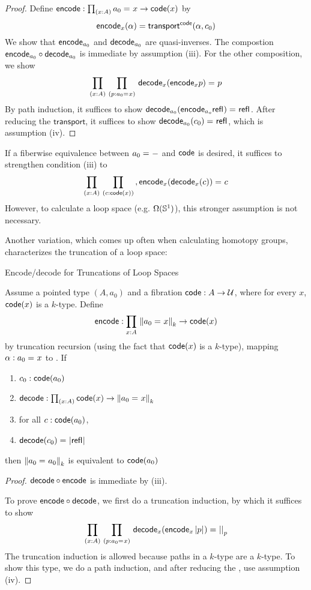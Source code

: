 \begin{proof}
Define
$\encode : \prd{x:A} \id{a_0}{x} \to \code(x)$ by
\[
\encode_x(\alpha) = \transfib{\code}{\alpha}{c_0}
\]
We show that $\encode_{a_0}$ and $\decode_{a_0}$ are quasi-inverses.  
The compostion $\encode_{a_0} \circ \decode_{a_0}$ is immediate by
assumption (iii).  For the other composition, we show
\[
\prd{x:A}{p : \id{a_0}{x}} \id{\decode_{x} (\encode_{x} p)}{p}
\] 
By path induction, it suffices to show 
$\id{{\decode_{{a_0}} (\encode_{{a_o}} \refl{})}}{\refl{}}$.
After reducing the $\mathsf{transport}$, it suffices to show 
$\id{{\decode_{{a_0}} (c_0)}}{\refl{}}$, which is assumption (iv).  
\end{proof}

If a fiberwise equivalence between $\id{a_0}{-}$ and $\code$ is desired,
it suffices to strengthen condition (iii) to
\[
\prd{x:A}{c : \code(x)}, \id{\encode_{x}(\decode_{x}(c))}{c}
\]
However, to calculate a loop space (e.g. $\Omega(\Sn ^1)$), this
stronger assumption is not necessary.  

Another variation, which comes up often when calculating homotopy
groups, characterizes the truncation of a loop space:
\begin{lem}{Encode/decode for Truncations of Loop Spaces}

Assume a pointed type $(A,a_0)$ and a fibration
$\code : A \to \type$, where for every $x$, $\code(x)$ is a $k$-type.
Define 
\[
\encode : \prd{x:A} \trunc{k}{\id{a_0}{x}} \to \code(x)
\]
by truncation recursion (using the fact
that $\code(x)$ is a $k$-type), mapping $\alpha : \id{a_0}{x}$ to 
.  If
\begin{enumerate}
\item $c_0 : \code(a_0)$
\item $\decode : \prd{x:A} \code(x) \to \trunc{k}{\id{a_0}{x}}$
\item for all $c : \code(a_0)$, 
\item $\id{\decode(c_0)}{\tproj{}{\refl{}}}$
\end{enumerate}
then $\trunc{k}{\id{a_0}{a_0}}$ is equivalent to $\code(a_0)$
\end{lem}

\begin{proof}
$\decode \circ \encode$ is immediate by (iii).  

To prove $\encode \circ \decode$, we first do a truncation induction, by
which it suffices to show
\[
\prd{x:A}{p : \id{a_0}{x}} \id{\decode_{x} (\encode_{x} \tproj{}{p})}{\tproj{p}}
\] 
The truncation induction is allowed because paths in a $k$-type are a
$k$-type.  To show this type, we do a path induction, and after reducing
the \encode, use assumption (iv).
\end{proof}


